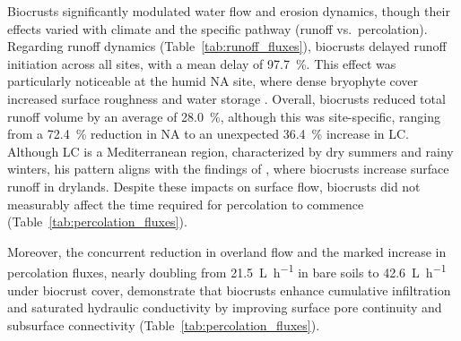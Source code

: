 Biocrusts significantly modulated water flow and erosion dynamics, though their effects varied with climate and the specific pathway (runoff vs.\ percolation). Regarding runoff dynamics (Table~\ref{tab:runoff_fluxes}), biocrusts delayed runoff initiation across all sites, with a mean delay of \SI{97.7}{\percent}. This effect was particularly noticeable at the humid NA site, where dense bryophyte cover increased surface roughness and water storage \citep{Kidron2022,RodriguezCaballero2012,Zeng2025}. Overall, biocrusts reduced total runoff volume by an average of \SI{28.0}{\percent}, although this was site-specific, ranging from a \SI{72.4}{\percent} reduction in NA to an unexpected \SI{36.4}{\percent} increase in LC. Although LC is a Mediterranean region, characterized by dry summers and rainy winters, his pattern aligns with the findings of \citet{Eldridge2020}, where biocrusts increase surface runoff in drylands. Despite these impacts on surface flow, biocrusts did not measurably affect the time required for percolation to commence (Table~\ref{tab:percolation_fluxes}).

Moreover, the concurrent reduction in overland flow and the marked increase in percolation fluxes, nearly doubling from \SI{21.5}{\liter\per\hour} in bare soils to \SI{42.6}{\liter\per\hour} under biocrust cover, demonstrate that biocrusts enhance cumulative infiltration and saturated hydraulic conductivity by improving surface pore continuity and subsurface connectivity (Table~\ref{tab:percolation_fluxes}).


